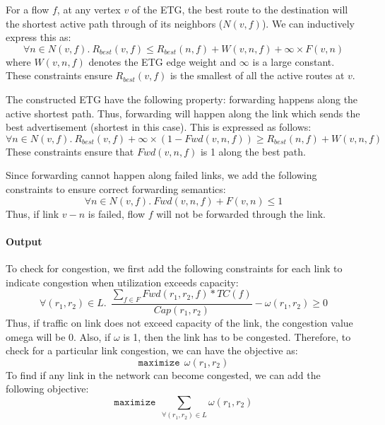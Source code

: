 \documentclass[]{article}
\begin{document}
For a flow $f$, at any vertex $v$ of the ETG, the best route to the
destination will the shortest active path through of its neighbors ($N(v,f)$).
We can inductively express this as: 
\begin{equation}
	\forall n \in N(v,f).~ R_{best}(v, f) \leq R_{best} (n, f) + W(v, n, f) + \infty \times F(v,n) 
\end{equation}
where $W(v,n,f)$ denotes the ETG edge weight and $\infty$ is a large constant. These
constraints ensure $R_{best}(v, f)$ is the smallest of all the active routes at $v$.

The constructed ETG have the following property: forwarding happens along the
active shortest path. Thus, forwarding will happen along the link which sends
the best advertisement (shortest in this case). This is expressed as follows:
\begin{equation}
	\forall n \in N(v,f). ~R_{best}(v,f) + \infty \times (1 - Fwd(v,n,f)) \geq R_{best} (n, f) + W(v, n, f)
\end{equation}
These constraints ensure that $Fwd(v,n,f)$ is 1 along the best path.

Since forwarding cannot happen along failed links, we add the following 
constraints to ensure correct forwarding semantics:
\begin{equation}
\forall n \in N(v,f).~Fwd(v,n,f) + F(v,n) \leq 1 
\end{equation}
Thus, if link $v-n$ is failed, flow $f$ will not be forwarded through the link.

\noindent\paragraph{Output} 
To check for congestion, we first add the following constraints for 
each link to indicate congestion when utilization exceeds capacity: 
\begin{equation}
\forall (r_1, r_2) \in L. ~~\frac{\sum_{f \in F} Fwd(r_1, r_2, f) * TC(f)}{Cap(r_1, r_2)} - \omega(r_1, r_2) \geq 0
\end{equation}
Thus, if traffic on link does not exceed capacity of the link, the congestion value
omega will be 0. Also, if $\omega$ is 1, then the link has to be congested. Therefore,
to check for a particular link congestion, we can have the objective as:
\[
\texttt{maximize} ~~\omega(r_1, r_2)
\]	
To find if any link in the network can become congested, we can add the following
objective:
\[
\texttt{maximize} ~~\sum_{\forall (r_1,r_2) \in L} \omega(r_1, r_2)
\]
\end{document}
